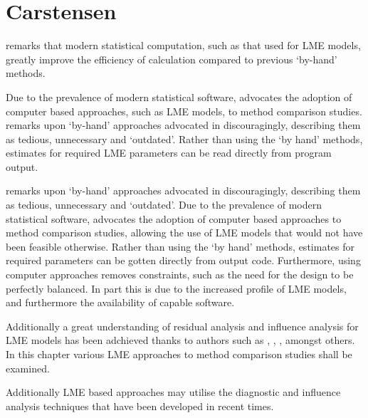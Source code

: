 \documentclass[12pt, a4paper]{report}
\theoremstyle{plain}
\theoremstyle{definition}
\theoremstyle{remark}
\begin{document}
\section*{Carstensen}
\citet{BXC2008} remarks that modern statistical computation, such as that used for LME models, greatly improve the efficiency of
calculation compared to previous `by-hand' methods.

Due to the prevalence of modern statistical software, \citet{BXC2008} advocates the adoption of computer based approaches, such as LME models, to method comparison studies. \citet{BXC2008} remarks upon `by-hand' approaches advocated in \citet{BA99} discouragingly, describing them as tedious, unnecessary and `outdated'. Rather than using the `by hand' methods, estimates for required LME parameters can be read directly from program output.

\citet{BXC2008} remarks upon `by-hand' approaches advocated in \citet{BA99} discouragingly, describing them as tedious, unnecessary and `outdated'. Due to the prevalence of modern statistical software, \citet{BXC2008} advocates the adoption of computer based approaches to method comparison studies, allowing the use of LME models that would not have been feasible otherwise. Rather than using the `by hand' methods, estimates for required parameters can be gotten directly from output code. Furthermore, using computer approaches removes constraints, such as the need for the design to be perfectly balanced.
In part this is due to the increased profile of LME models, and furthermore the availability of capable software.  

Additionally a great understanding of residual analysis and influence analysis for LME models has been adchieved thanks to authors such as \citet{schab}, \citet{CPJ}, \citet{cook86} \citet{west}, amongst others. In this chapter various LME approaches to method comparison studies shall
be examined. 

Additionally LME based approaches may utilise the diagnostic and influence analysis techniques that have been developed in recent times.


%
%
%
%
\end{document}
